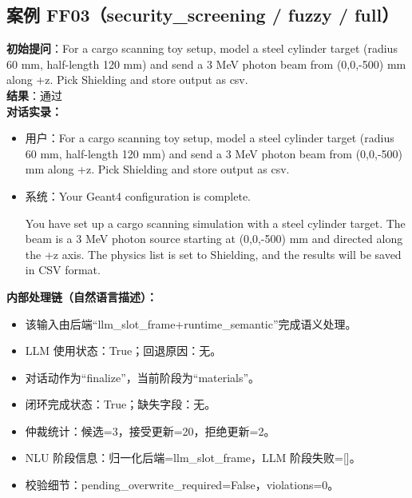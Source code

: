 \documentclass[11pt]{ctexart}
\begin{document}
\subsection{案例 FF03（security\_screening / fuzzy / full）}
\textbf{初始提问}：For a cargo scanning toy setup, model a steel cylinder target (radius 60 mm, half-length 120 mm) and send a 3 MeV photon beam from (0,0,-500) mm along +z. Pick Shielding and store output as csv.\\
\textbf{结果}：通过\\
\textbf{对话实录：}
\begin{itemize}
\item 用户：For a cargo scanning toy setup, model a steel cylinder target (radius 60 mm, half-length 120 mm) and send a 3 MeV photon beam from (0,0,-500) mm along +z. Pick Shielding and store output as csv.
\item 系统：Your Geant4 configuration is complete.

You have set up a cargo scanning simulation with a steel cylinder target. The beam is a 3 MeV photon source starting at (0,0,-500) mm and directed along the +z axis. The physics list is set to Shielding, and the results will be saved in CSV format.
\end{itemize}
\textbf{内部处理链（自然语言描述）：}
\begin{itemize}
\item 该输入由后端“llm\_slot\_frame+runtime\_semantic”完成语义处理。
\item LLM 使用状态：True；回退原因：无。
\item 对话动作为“finalize”，当前阶段为“materials”。
\item 闭环完成状态：True；缺失字段：无。
\item 仲裁统计：候选=3，接受更新=20，拒绝更新=2。
\item NLU 阶段信息：归一化后端=llm\_slot\_frame，LLM 阶段失败=[]。
\item 校验细节：pending\_overwrite\_required=False，violations=0。
\end{itemize}
\end{document}
